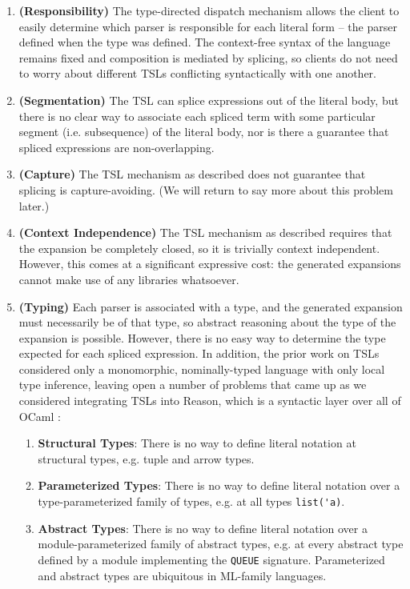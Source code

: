 \documentclass[acmsmall,review,anonymous]{acmart}\settopmatter{printfolios=true,printccs=false,printacmref=false}
\newcommand{\li}[1]{\lstinline[basicstyle=\ttfamily\fontsize{9pt}{1em}\selectfont]{#1}}
\begin{document}
\begin{enumerate}[leftmargin=12px]
  \item[\CIRCLE] \textbf{(Responsibility)} The type-directed dispatch mechanism allows the client to easily determine which parser is responsible for each literal form -- the parser defined when the type was defined. The context-free syntax of the language remains fixed and composition is mediated by splicing, so clients do not need to worry about different TSLs conflicting syntactically with one another. 
  \item[\Circle] \textbf{(Segmentation)} The TSL can splice expressions out of the literal body, but there is no clear way to associate each spliced term with some particular segment (i.e. subsequence) of the literal body, nor is there a guarantee that spliced expressions are non-overlapping.
  \item[\Circle] \textbf{(Capture)} The TSL mechanism as described does not guarantee that splicing is capture-avoiding. (We will return to say more about this problem later.)
  \item[\LEFTcircle] \textbf{(Context Independence)} The TSL mechanism as described requires that the expansion be completely closed, so it is trivially context independent. However, this comes at a significant expressive cost: the generated expansions cannot make use of any libraries whatsoever.
  \item[\LEFTcircle] \textbf{(Typing)} Each parser is associated with a type, and the generated expansion must necessarily be of that type, so abstract reasoning about the type of the expansion is possible. However, there is no easy way to determine the type expected for each spliced expression. In addition, the prior work on TSLs considered only a monomorphic, nominally-typed language with only local type inference, leaving open a number of problems that came up as we considered integrating TSLs into Reason, which is a syntactic layer over all of OCaml \cite{ocaml-manual}:
\begin{enumerate}[leftmargin=15px]
  \item \textbf{Structural Types}: There is no way to define literal notation at structural types, e.g. tuple and arrow types.
  \item \textbf{Parameterized Types}: There is no way to define literal notation over a type-parameterized family of types, e.g. at all types \li{list('a)}.
  \item \textbf{Abstract Types}: There is no way to define literal notation over a module-parameterized family of abstract types, e.g. at every abstract type defined by a module implementing the \li{QUEUE} signature. Parameterized and abstract types are ubiquitous in ML-family languages.%

\end{enumerate}
\end{enumerate}
\end{document}
